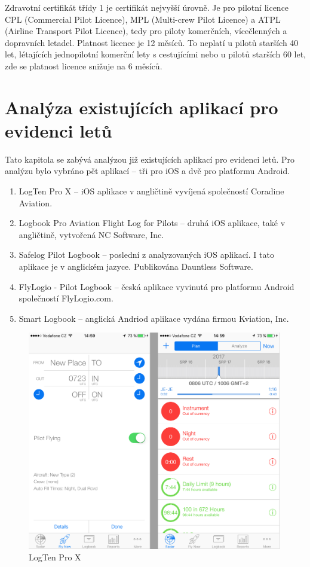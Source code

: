 \documentclass[thesis=M,czech]{FITthesis}[2012/06/26]
\begin{document}
Zdravotní certifikát třídy 1 je certifikát nejvyšší úrovně. Je pro pilotní licence CPL (Commercial Pilot Licence), MPL (Multi-crew Pilot Licence) a ATPL (Airline Transport Pilot Licence), tedy pro piloty komerčních, vícečlenných a dopravních letadel. Platnost licence je 12 měsíců. To neplatí u pilotů starších 40 let, létajících jednopilotní komerční lety s cestujícími nebo u pilotů starších 60 let, zde se platnost licence snižuje na 6 měsíců. \cite{CAA}

\section{Analýza existujících aplikací pro evidenci letů}
Tato kapitola se zabývá analýzou již existujících aplikací pro evidenci letů. Pro analýzu bylo vybráno pět aplikací -- tři pro iOS a dvě pro platformu Android.
\begin{enumerate}
\item LogTen Pro X -- iOS aplikace v angličtině vyvíjená společností Coradine Aviation. \cite{appStoreLogTen}
\item Logbook Pro Aviation Flight Log for Pilots -- druhá iOS aplikace, také v angličtině, vytvořená NC Software, Inc. \cite{appStoreLogbookPro}
\item Safelog Pilot Logbook -- poslední z analyzovaných iOS aplikací. I tato aplikace je v anglickém jazyce. Publikována Dauntless Software. \cite{appStoreSafeLog}
\item FlyLogio - Pilot Logbook -- česká aplikace vyvinutá pro platformu Android společností FlyLogio.com. \cite{googleFlyLogio}
\item Smart Logbook -- anglická Andriod aplikace vydána firmou Kviation, Inc. \cite{googleSmartLogbook}
\end{enumerate}

\begin{figure}[]\centering
 \includegraphics[width=0.99\textwidth]{./pictures/existujiciAplikace/LogTenProX}
 \caption[LogTen Pro X]{LogTen Pro X}\label{fig:LogTenProX}
\end{figure}
\end{document}
